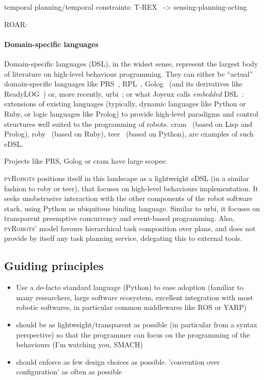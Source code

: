 \documentclass[a4paper, 10pt, conference]{ieeeconf}      %
\newcommand{\pyRobots}{\textsc{pyRobots}}
\begin{document}
temporal planning/temporal constraints: T-REX~\cite{mcgann2007trex} -> sensing-planning-acting

ROAR: ~\cite{degroote2011roar}

\paragraph{Domain-specific languages}

Domain-specific languages (DSL), in the widest sense, represent the largest body
of literature on high-level behaviour programming. They can either be ``actual''
domain-specific languages like PRS~\cite{ingrand1996prs},
RPL~\cite{mcdermott1993reactive}, Golog~\cite{levesque1997golog} (and its
derivatives like {\sc ReadyLOG}~\cite{ferrein2007robot}) or, more recently,
{\sc urbi}~\cite{baillie2005urbi}; or what Joyeux calls \emph{embedded}
DSL~\cite{joyeux2011robot}: extensions of existing languages (typically, dynamic
languages like Python or Ruby, or logic languages like Prolog) to provide
high-level paradigms and control structures well suited to the programming of
robots. {\sc cram}~\cite{beetz2010cram} (based on Lisp and Prolog), {\sc
roby}~\cite{joyeux2009plan} (based on Ruby), {\sc
teer}~\cite{magnenat2012teer} (based on Python), are
examples of such eDSL.

Projects like PRS, Golog or {\sc cram} have large scopes:


\pyRobots{} positions itself in this landscape as a lightweight eDSL (in a similar
fashion to {\sc roby} or {\sc teer}), that focuses on high-level behaviours
implementation. It seeks unobstrusive interaction with the other components of
the robot software stack, using Python as ubiquitous binding language. Similar
to {\sc urbi}, it focuses on transparent preemptive concurrency and event-based programming.
Also, \pyRobots{}' model favours hierarchical task composition over plans, and does not
provide by itself any task planning service, delegating this to external tools.

\subsection{Guiding principles}

\begin{itemize}
    \item Use a de-facto standard language (Python) to ease adoption (familiar to
        many researchers, large software ecosystem, excellent integration with
        most robotic softwares, in particular common middlewares like ROS or
        YARP)
    \item should be as lightweight/transparent as possible (in particular from a
        syntax perspective) so that the
        programmer can focus on the programming of the behaviours (I'm
        watching you, SMACH)
    \item should enforce as few design choices as possible. 'convention over
        configuration' as often as possible
\end{itemize}
\end{document}
